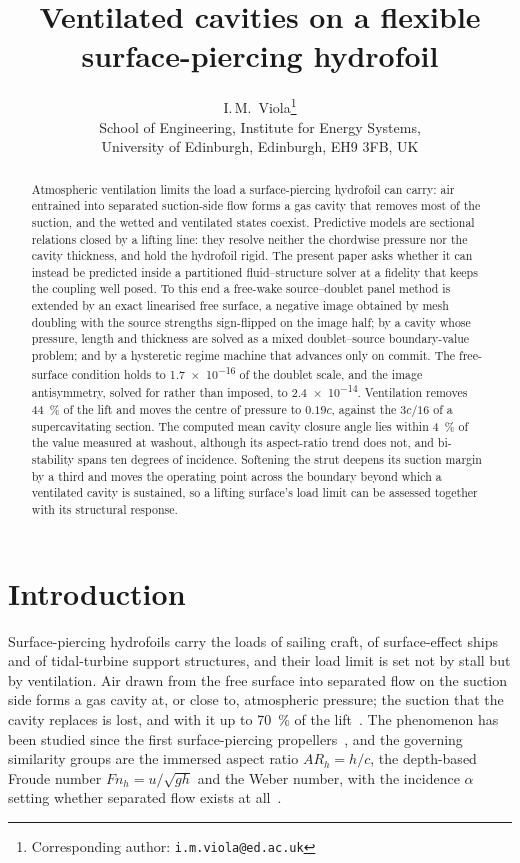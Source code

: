 \documentclass[11pt,a4paper]{article}
\title{\bf Ventilated cavities on a flexible surface-piercing hydrofoil}
\author{%
  I.\,M.\ Viola\thanks{Corresponding author: \texttt{i.m.viola@ed.ac.uk}}\\[2pt]
  \small School of Engineering, Institute for Energy Systems,\\
  \small University of Edinburgh, Edinburgh, EH9 3FB, UK}
\date{}
\newcommand{\Fnh}{\mathit{Fn}_h}
\newcommand{\ARh}{\mathit{AR}_h}
\begin{document}
\maketitle

\begin{abstract}
\noindent
Atmospheric ventilation limits the load a surface-piercing hydrofoil can carry:
air entrained into separated suction-side flow forms a gas cavity that removes
most of the suction, and the wetted and ventilated states coexist. Predictive
models are sectional relations closed by a lifting line: they resolve neither the
chordwise pressure nor the cavity thickness, and hold the hydrofoil rigid. The present paper asks whether it
can instead be predicted inside a partitioned fluid--structure solver at a
fidelity that keeps the coupling well posed. To this end a free-wake
source--doublet panel method is extended by an exact linearised free surface, a
negative image obtained by mesh doubling with the source strengths sign-flipped
on the image half; by a cavity whose pressure, length and thickness are solved as
a mixed doublet--source boundary-value problem; and by a hysteretic regime
machine that advances only on commit. The
free-surface condition holds to \num{1.7e-16} of the doublet scale, and the image
antisymmetry, solved for rather than imposed, to \num{2.4e-14}. Ventilation removes
\SI{44}{\percent} of the lift and moves the centre of pressure to $0.19c$,
against the $3c/16$ of a supercavitating section. The computed mean cavity closure
angle lies within \SI{4}{\percent} of the value measured at washout, although its
aspect-ratio trend does not, and bi-stability spans ten degrees of incidence. Softening the strut deepens its suction margin by a
third and moves the operating point across the boundary beyond which a
ventilated cavity is sustained, so a lifting surface's load limit can be assessed
together with its structural response.
\end{abstract}

\section{Introduction}
\label{sec:Intro}

Surface-piercing hydrofoils carry the loads of sailing craft, of surface-effect
ships and of tidal-turbine support structures, and their load limit is set not by
stall but by ventilation. Air drawn from the free surface into separated flow on
the suction side forms a gas cavity at, or close to, atmospheric pressure; the
suction that the cavity replaces is lost, and with it up to
\SI{70}{\percent} of the lift~\citep{Breslin1959}. The phenomenon has been
studied since the first surface-piercing propellers~\citep{Wetzel1957}, and the
governing similarity groups are the immersed aspect ratio $\ARh = h/c$, the
depth-based Froude number $\Fnh = u/\sqrt{gh}$ and the Weber number, with the
incidence $\alpha$ setting whether separated flow exists at
all~\citep{Harwood2016}.
\end{document}
